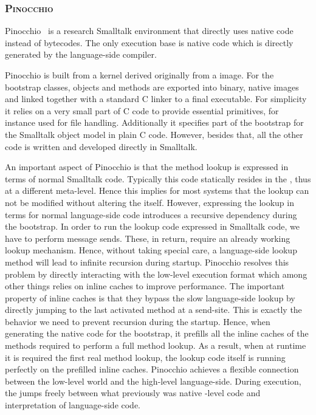 \subsubsection*{\textsc{Pinocchio \VM}}

Pinocchio~\cite{Verw11a} is a research Smalltalk environment that directly uses native code instead of bytecodes.
The only execution base is native code which is directly generated by the language-side compiler.

Pinocchio is built from a kernel derived originally from a \PH image.
For the bootstrap classes, objects and methods are exported into binary, native images and linked together with a standard C linker to a final executable.
For simplicity it relies on a very small part of C code to provide essential primitives, for instance used for file handling.
Additionally it specifies part of the bootstrap for the Smalltalk object model in plain C code.
However, besides that, all the other code is written and developed directly in Smalltalk.

An important aspect of Pinocchio is that the method lookup is expressed in terms of normal Smalltalk code.
Typically this code statically resides in the \VM, thus at a different meta-level.
Hence this implies for most systems that the lookup can not be modified without altering the \VM itself.
However, expressing the lookup in terms for normal language-side code introduces a recursive dependency during the bootstrap.
In order to run the lookup code expressed in Smalltalk code, we have to perform message sends.
These, in return, require an already working lookup mechanism.
Hence, without taking special care, a language-side lookup method will lead to infinite recursion during startup.
Pinocchio resolves this problem by directly interacting with the low-level execution format which among other things relies on inline caches to improve performance.
The important property of inline caches is that they bypass the slow language-side lookup by directly jumping to the last activated method at a send-site.
This is exactly the behavior we need to prevent recursion during the startup.
Hence, when generating the native code for the bootstrap, it prefills all the inline caches of the methods required to perform a full method lookup.
As a result, when at runtime it is required the first real method lookup, the lookup code itself is running perfectly on the prefilled inline caches.
Pinocchio achieves a flexible connection between the low-level world and the high-level language-side.
During execution, the \VM jumps freely between what previously was native \VM-level code and interpretation of language-side code.

